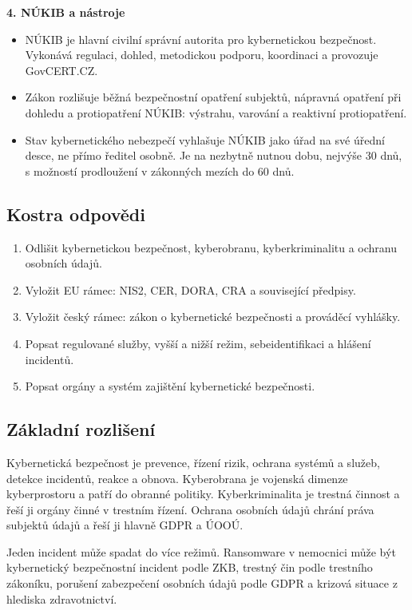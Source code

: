 \textbf{4. NÚKIB a nástroje}
\begin{itemize}
  \item NÚKIB je hlavní civilní správní autorita pro kybernetickou bezpečnost. Vykonává regulaci, dohled, metodickou podporu, koordinaci a provozuje GovCERT.CZ.
  \item Zákon rozlišuje běžná bezpečnostní opatření subjektů, nápravná opatření při dohledu a protiopatření NÚKIB: výstrahu, varování a reaktivní protiopatření.
  \item Stav kybernetického nebezpečí vyhlašuje NÚKIB jako úřad na své úřední desce, ne přímo ředitel osobně. Je na nezbytně nutnou dobu, nejvýše 30 dnů, s možností prodloužení v zákonných mezích do 60 dnů.
\end{itemize}

\subsection*{Kostra odpovědi}
\begin{enumerate}
  \item Odlišit kybernetickou bezpečnost, kyberobranu, kyberkriminalitu a ochranu osobních údajů.
  \item Vyložit EU rámec: NIS2, CER, DORA, CRA a související předpisy.
  \item Vyložit český rámec: zákon o kybernetické bezpečnosti a prováděcí vyhlášky.
  \item Popsat regulované služby, vyšší a nižší režim, sebeidentifikaci a hlášení incidentů.
  \item Popsat orgány a systém zajištění kybernetické bezpečnosti.
\end{enumerate}

\subsection*{Základní rozlišení}
Kybernetická bezpečnost je prevence, řízení rizik, ochrana systémů a služeb, detekce incidentů, reakce a obnova. Kyberobrana je vojenská dimenze kyberprostoru a patří do obranné politiky. Kyberkriminalita je trestná činnost a řeší ji orgány činné v trestním řízení. Ochrana osobních údajů chrání práva subjektů údajů a řeší ji hlavně GDPR a ÚOOÚ.

Jeden incident může spadat do více režimů. Ransomware v nemocnici může být kybernetický bezpečnostní incident podle ZKB, trestný čin podle trestního zákoníku, porušení zabezpečení osobních údajů podle GDPR a krizová situace z hlediska zdravotnictví.

